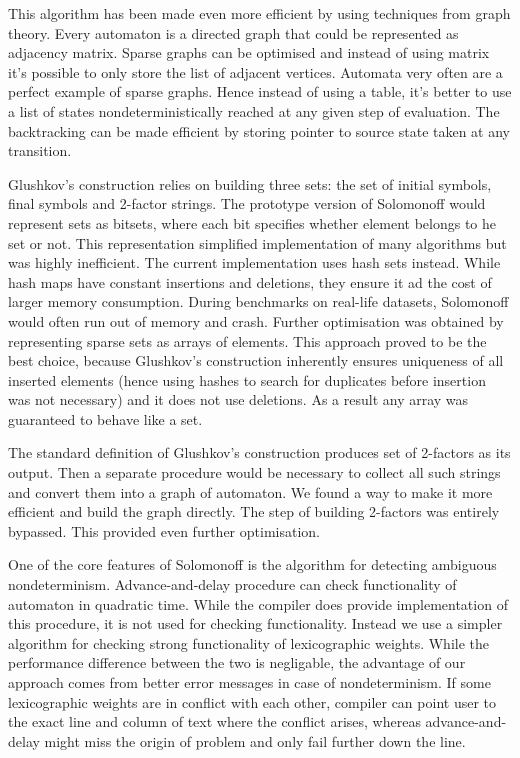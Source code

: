 This algorithm has been made even more efficient by using techniques from graph theory. Every automaton is a directed graph that could be represented as adjacency matrix. Sparse graphs can be optimised and instead of using matrix it's possible to only store the list of adjacent vertices.  Automata very often are a perfect example of sparse graphs. Hence instead of using a table, it's better to use a list of states nondeterministically reached at any given step of evaluation. The backtracking can be made efficient by storing pointer to source state taken at any transition.

Glushkov's construction relies on building three sets: the set of initial symbols, final symbols and 2-factor strings. The prototype version of Solomonoff would represent sets as bitsets, where each bit specifies whether element belongs to he set or not. This representation simplified implementation of many algorithms but was highly inefficient. The current implementation uses hash sets instead. While hash maps have constant insertions and deletions, they ensure it ad the cost of larger memory consumption. During benchmarks on real-life datasets, Solomonoff would often run out of memory and crash. Further optimisation was obtained by representing sparse sets as arrays of elements. This approach proved to be the best choice, because Glushkov's construction inherently ensures uniqueness of all inserted elements (hence using hashes to search for duplicates before insertion was not necessary)  and it does not use deletions. As a result any array was guaranteed to behave like a set.

The standard definition of Glushkov's construction produces set of 2-factors as its output. Then a separate procedure would be necessary to collect all such strings and convert them into a graph of automaton. We found a way to make it more efficient and build the graph directly. The step of building 2-factors was entirely bypassed. This provided even further optimisation.

One of the core features of Solomonoff is the algorithm for detecting ambiguous nondeterminism. Advance-and-delay procedure can check functionality of automaton in quadratic time. While the compiler does provide implementation of this procedure, it is not used for checking functionality. Instead we use a simpler algorithm for checking strong functionality of lexicographic weights. While the performance difference between the two is negligable, the advantage of our approach comes from  better error messages in case of nondeterminism. If some lexicographic weights are in conflict with each other, compiler can point user to the exact line and column of text where the conflict arises, whereas advance-and-delay might miss the origin of problem and only fail further down the line.















